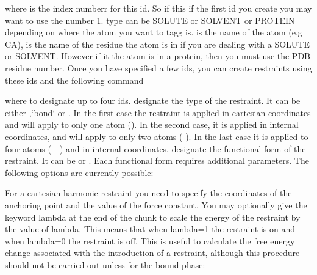 \documentclass[letterpaper,10pt,english]{sphinxmanual}
\begin{document}
where  is the index numberr for this id. So if this if the first id you create you may want to use the number 1. type can be SOLUTE or SOLVENT or PROTEIN depending on where the atom you want to tagg is.  is the name of the atom (e.g CA),  is the name of the residue the atom is in if you are dealing with a SOLUTE or SOLVENT. However if it the atom is in a protein, then you must use the PDB residue number.
Once you have specified a few ids, you can create restraints using these ids and the following command

%
\begin{sphinxVerbatim}[commandchars=\\\{\}]
   \PYG{p}{[}\PYG{p}{]}   \PYG{p}{[} \PYG{p}{]}
\end{sphinxVerbatim}

where  to  designate up to four ids.  designate the type of the restraint. It can be either ,{}`bond{}` or . In the first case the restraint is applied in cartesian coordinates and will apply to only one atom (). In the second case, it is applied in internal coordinates, and will apply to only two atoms (-). In the last case it is applied to four atoms (---) and in internal coordinates.  designate the functional form of the restraint. It can be  or . Each functional form requires additional parameters. The following options are currently possible:

\ignorespaces 
\def\sphinxLiteralBlockLabel{\label{\detokenize{protoms:index-77}}}
%
\begin{sphinxVerbatim}[commandchars=\\\{\}]
          \PYG{p}{[}\PYG{p}{]}
\end{sphinxVerbatim}

For a cartesian harmonic restraint you need to specify the coordinates of the anchoring point and the value of the force constant. You may optionally give the keyword lambda at the end of the chunk to scale the energy of the restraint by the value of lambda. This means that when lambda=1 the restraint is on and when lambda=0 the restraint is off. This is useful to calculate the free energy change associated with the introduction of a restraint, although this procedure should not be carried out unless for the bound phase:
\end{document}
